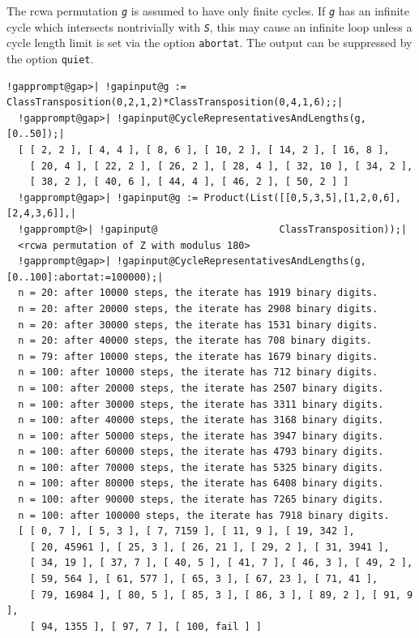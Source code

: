 \documentclass[a4paper,11pt]{report}
\begin{document}
{{{ The rcwa permutation \mbox{\texttt{\mdseries\slshape g}} is assumed to have only finite cycles. If \mbox{\texttt{\mdseries\slshape g}} has an infinite cycle which intersects non\texttt{}trivially with \mbox{\texttt{\mdseries\slshape S}}, this may cause an infinite loop unless a cycle length limit is set via the
option \texttt{abortat}. The output can be suppressed by the option \texttt{quiet}. 
\begin{Verbatim}[commandchars=!@|,fontsize=\small,frame=single,label=Example]
  !gapprompt@gap>| !gapinput@g := ClassTransposition(0,2,1,2)*ClassTransposition(0,4,1,6);;|
  !gapprompt@gap>| !gapinput@CycleRepresentativesAndLengths(g,[0..50]);|
  [ [ 2, 2 ], [ 4, 4 ], [ 8, 6 ], [ 10, 2 ], [ 14, 2 ], [ 16, 8 ], 
    [ 20, 4 ], [ 22, 2 ], [ 26, 2 ], [ 28, 4 ], [ 32, 10 ], [ 34, 2 ], 
    [ 38, 2 ], [ 40, 6 ], [ 44, 4 ], [ 46, 2 ], [ 50, 2 ] ]
  !gapprompt@gap>| !gapinput@g := Product(List([[0,5,3,5],[1,2,0,6],[2,4,3,6]],|
  !gapprompt@>| !gapinput@                     ClassTransposition));|
  <rcwa permutation of Z with modulus 180>
  !gapprompt@gap>| !gapinput@CycleRepresentativesAndLengths(g,[0..100]:abortat:=100000);|
  n = 20: after 10000 steps, the iterate has 1919 binary digits.
  n = 20: after 20000 steps, the iterate has 2908 binary digits.
  n = 20: after 30000 steps, the iterate has 1531 binary digits.
  n = 20: after 40000 steps, the iterate has 708 binary digits.
  n = 79: after 10000 steps, the iterate has 1679 binary digits.
  n = 100: after 10000 steps, the iterate has 712 binary digits.
  n = 100: after 20000 steps, the iterate has 2507 binary digits.
  n = 100: after 30000 steps, the iterate has 3311 binary digits.
  n = 100: after 40000 steps, the iterate has 3168 binary digits.
  n = 100: after 50000 steps, the iterate has 3947 binary digits.
  n = 100: after 60000 steps, the iterate has 4793 binary digits.
  n = 100: after 70000 steps, the iterate has 5325 binary digits.
  n = 100: after 80000 steps, the iterate has 6408 binary digits.
  n = 100: after 90000 steps, the iterate has 7265 binary digits.
  n = 100: after 100000 steps, the iterate has 7918 binary digits.
  [ [ 0, 7 ], [ 5, 3 ], [ 7, 7159 ], [ 11, 9 ], [ 19, 342 ],
    [ 20, 45961 ], [ 25, 3 ], [ 26, 21 ], [ 29, 2 ], [ 31, 3941 ],
    [ 34, 19 ], [ 37, 7 ], [ 40, 5 ], [ 41, 7 ], [ 46, 3 ], [ 49, 2 ],
    [ 59, 564 ], [ 61, 577 ], [ 65, 3 ], [ 67, 23 ], [ 71, 41 ],
    [ 79, 16984 ], [ 80, 5 ], [ 85, 3 ], [ 86, 3 ], [ 89, 2 ], [ 91, 9 ],
    [ 94, 1355 ], [ 97, 7 ], [ 100, fail ] ]
\end{Verbatim}
 }

}}
\end{document}
